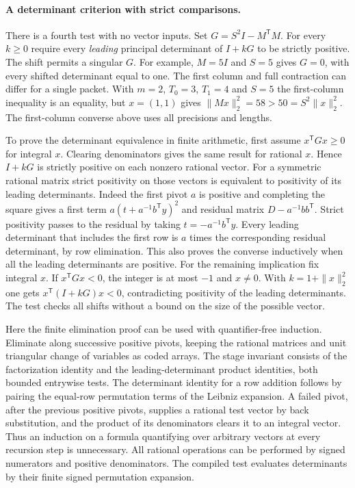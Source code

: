 \paragraph{A determinant criterion with strict comparisons.}
There is a fourth test with no vector inputs. Set $G=S^2 I-M^{\mathsf T}M$. For every $k\ge0$ require every \emph{leading} principal determinant of $I+kG$ to be strictly positive. The shift permits a singular $G$. For example, $M=5I$ and $S=5$ gives $G=0$, with every shifted determinant equal to one. The first column and full contraction can differ for a single packet. With $m=2$, $T_0=3$, $T_1=4$ and $S=5$ the first-column inequality is an equality, but $x=(1,1)$ gives $\|Mx\|_2^2=58>50=S^2\|x\|_2^2$. The first-column converse above uses all precisions and lengths.

To prove the determinant equivalence in finite arithmetic, first assume $x^{\mathsf T}Gx\ge0$ for integral $x$. Clearing denominators gives the same result for rational $x$. Hence $I+kG$ is strictly positive on each nonzero rational vector. For a symmetric rational matrix strict positivity on those vectors is equivalent to positivity of its leading determinants. Indeed the first pivot $a$ is positive and completing the square gives a first term $a(t+a^{-1}b^{\mathsf T}y)^2$ and residual matrix $D-a^{-1}bb^{\mathsf T}$. Strict positivity passes to the residual by taking $t=-a^{-1}b^{\mathsf T}y$. Every leading determinant that includes the first row is $a$ times the corresponding residual determinant, by row elimination. This also proves the converse inductively when all the leading determinants are positive. For the remaining implication fix integral $x$. If $x^{\mathsf T}Gx<0$, the integer is at most $-1$ and $x\ne0$. With $k=1+\|x\|_2^2$ one gets $x^{\mathsf T}(I+kG)x<0$, contradicting positivity of the leading determinants. The test checks all shifts without a bound on the size of the possible vector.

Here the finite elimination proof can be used with quantifier-free induction. Eliminate along successive positive pivots, keeping the rational matrices and unit triangular change of variables as coded arrays. The stage invariant consists of the factorization identity and the leading-determinant product identities, both bounded entrywise tests. The determinant identity for a row addition follows by pairing the equal-row permutation terms of the Leibniz expansion. A failed pivot, after the previous positive pivots, supplies a rational test vector by back substitution, and the product of its denominators clears it to an integral vector. Thus an induction on a formula quantifying over arbitrary vectors at every recursion step is unnecessary. All rational operations can be performed by signed numerators and positive denominators. The compiled test evaluates determinants by their finite signed permutation expansion.

